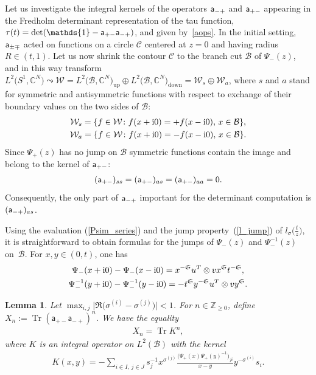 \documentclass[pdftex]{sigma}
\def\mf{\mathfrak}
\numberwithin{equation}{section}
\newtheorem{Lemma}[Theorem]{Lemma}
\begin{document}
Let us investigate the integral kernels of the operators ${\sf a_{-+}}$ and ${\sf a_{+-}}$ appearing in the Fredholm determinant representation of the tau function, $\tau(t)=\det(\mathds{1}-{\sf a_{+-}} {\sf a_{-+}})$,
and given by~\eqref{aops}. In the initial setting, ${\sf a_{\pm\mp}}$ acted on functions on a circle $\mathcal C$ centered at $z=0$ and having radius $R\in(t,1)$. Let us now shrink the contour $\mathcal C$ to the branch cut
$\mathcal B$ of $\Psi_-(z)$, and in this way transform $L^2\big(S^1,\mathbb{C}^N\big)\leadsto \mathcal{W}=L^2\big(\mathcal B,\mathbb{C}^N\big)_{\mathrm{up}}\oplus L^2\big(\mathcal B,\mathbb{C}^N\big)_{\mathrm{down}}=\mathcal{W}_{s}\oplus \mathcal{W}_{a}$, where $s$ and $a$ stand for symmetric and antisymmetric functions with respect to exchange of their boundary values on the two sides of $\mathcal{B}$:
\begin{gather*}
\mathcal W_{s}= \{f\in\mathcal W\colon f(x+{\rm i}0)=+ f(x-{\rm i}0),\,x\in\mathcal B \} ,\\
\mathcal W_{a}= \{f\in\mathcal W\colon f(x+{\rm i}0)=- f(x-{\rm i}0),\,x\in\mathcal B \} .
\end{gather*}
Since $\Psi_+(z)$ has no jump on $\mathcal B$ symmetric functions contain the image and belong to the kernel of $\sf a_{+-}$:
\begin{gather*}
({\sf a}_{+-})_{ss}=({\sf a}_{+-})_{as}=({\sf a}_{+-})_{aa}=0.
\end{gather*}
Consequently, the only part of $\sf a_{-+}$ important for the determinant computation is $({\sf a_{-+}})_{as}$.

Using the evaluation (\ref{Psim_series}) and the jump property~(\ref{l_jump}) of $l_\sigma\big(\frac tz\big)$, it is straightforward to obtain formulas for the jumps of $\Psi_-(z)$ and $\Psi_-^{-1}(z)$ on~$\mathcal B$. For $x,y\in(0,t)$, one has
\begin{gather}%
\Psi_-(x+{\rm i}0)-\Psi_-(x-{\rm i}0)= x^{-\mf{S}} u^T \otimes v x^{\mf{S}} t^{-\mf{S}},\nonumber\\
\label{Psiinv_jump}
\Psi_-^{-1}(y+{\rm i}0)-\Psi_-^{-1}(y-{\rm i}0)= - t^{\mf{S}} y^{-\mf{S}} u^T \otimes v y^{\mf{S}} .
\end{gather}

\begin{Lemma}\label{lemmaF21}Let $\max_{i,j}\big|\Re \big(\sigma^{(i)}-\sigma^{(j)}\big)\big|<1$. For $n\in\mathbb Z_{\ge0}$, define $X_n:=\operatorname{Tr}(\mathsf a_{+-}\mathsf a_{-+})^n$. We have the equality
\begin{gather}\label{Kn}
X_n=\operatorname{Tr} K^n,
\end{gather}
where $ K$ is an integral operator on $L^2(\mathcal B)$ with the kernel
\begin{gather}\label{kernelKF}
K(x,y) =-\sum_{i\in I,\,j\in J} s_j^{-1} x^{\sigma^{(j)}} \frac{\big(\Psi_+(x)\Psi_+(y)^{-1}\big)_{ji}}{x-y} y^{-\sigma^{(i)}} s_i .
\end{gather}
\end{Lemma}
\end{document}
